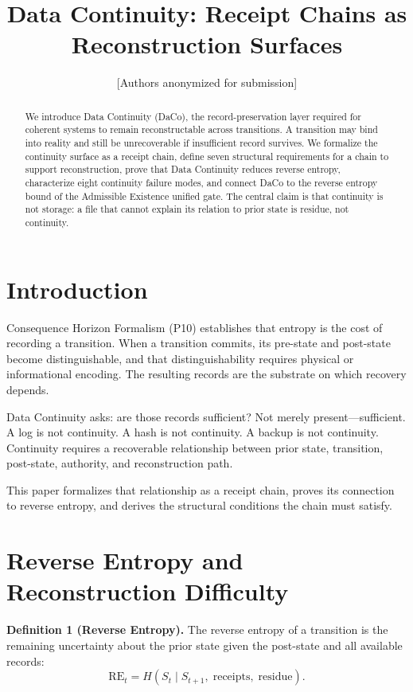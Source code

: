 \documentclass[letterpaper,10pt,conference]{ieeeconf}
\title{\bf Data Continuity: Receipt Chains as Reconstruction Surfaces}
\author{[Authors anonymized for submission]}
\newcommand{\RE}{\mathrm{RE}}
\newcommand{\St}{S_t}
\newcommand{\Stp}{S_{t+1}}
\begin{document}
\maketitle
\thispagestyle{empty}
\pagestyle{empty}

\begin{abstract}
We introduce Data Continuity (DaCo), the record-preservation layer required for coherent systems to remain reconstructable across transitions. A transition may bind into reality and still be unrecoverable if insufficient record survives. We formalize the continuity surface as a receipt chain, define seven structural requirements for a chain to support reconstruction, prove that Data Continuity reduces reverse entropy, characterize eight continuity failure modes, and connect DaCo to the reverse entropy bound of the Admissible Existence unified gate. The central claim is that continuity is not storage: a file that cannot explain its relation to prior state is residue, not continuity.
\end{abstract}

\section{Introduction}

Consequence Horizon Formalism (P10) establishes that entropy is the cost of recording a transition. When a transition commits, its pre-state and post-state become distinguishable, and that distinguishability requires physical or informational encoding. The resulting records are the substrate on which recovery depends.

Data Continuity asks: are those records sufficient? Not merely present---sufficient. A log is not continuity. A hash is not continuity. A backup is not continuity. Continuity requires a recoverable relationship between prior state, transition, post-state, authority, and reconstruction path.

This paper formalizes that relationship as a receipt chain, proves its connection to reverse entropy, and derives the structural conditions the chain must satisfy.

\section{Reverse Entropy and Reconstruction Difficulty}

\textbf{Definition 1 (Reverse Entropy).} The reverse entropy of a transition is the remaining uncertainty about the prior state given the post-state and all available records:
\[
\RE_t = H(\St \mid \Stp,\; \text{receipts},\; \text{residue}).
\]
\end{document}
